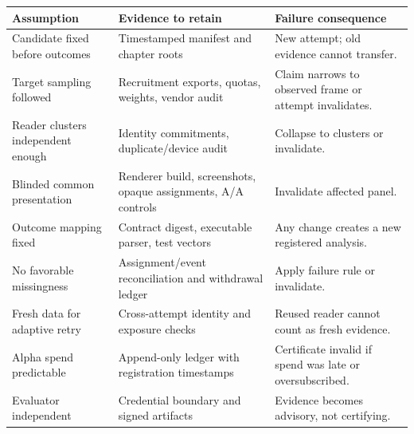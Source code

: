 \documentclass[11pt]{article}
\theoremstyle{remark}
\begin{document}
\begin{center}
\small
\begin{tabular}{p{}p{}p{}}
\toprule
Assumption & Evidence to retain & Failure consequence \\
\midrule
Candidate fixed before outcomes & Timestamped manifest and chapter roots & New attempt; old
evidence cannot transfer. \\
Target sampling followed & Recruitment exports, quotas, weights, vendor audit & Claim narrows
to observed frame or attempt invalidates. \\
Reader clusters independent enough & Identity commitments, duplicate/device audit & Collapse
to clusters or invalidate. \\
Blinded common presentation & Renderer build, screenshots, opaque assignments, A/A controls &
Invalidate affected panel. \\
Outcome mapping fixed & Contract digest, executable parser, test vectors & Any change creates
a new registered analysis. \\
No favorable missingness & Assignment/event reconciliation and withdrawal ledger & Apply
failure rule or invalidate. \\
Fresh data for adaptive retry & Cross-attempt identity and exposure checks & Reused reader
cannot count as fresh evidence. \\
Alpha spend predictable & Append-only ledger with registration timestamps & Certificate
invalid if spend was late or oversubscribed. \\
Evaluator independent & Credential boundary and signed artifacts & Evidence becomes advisory,
not certifying. \\
\bottomrule
\end{tabular}
\end{center}
\end{document}

